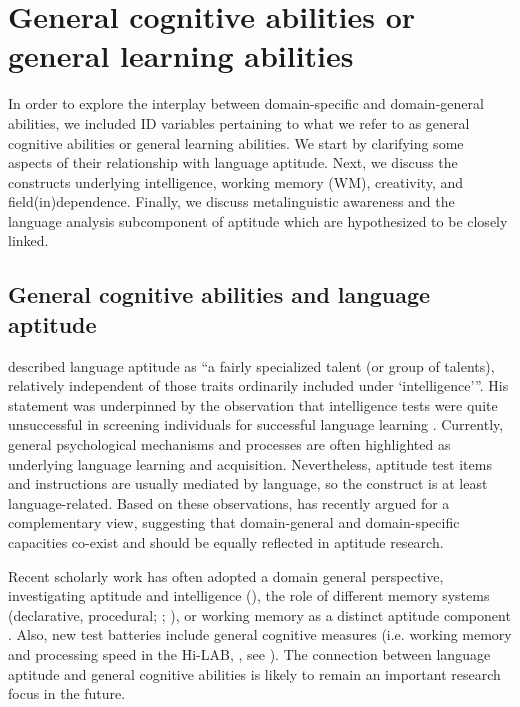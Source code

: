 \documentclass[output=paper]{langscibook}
\begin{document}
\section{General cognitive abilities or general learning abilities}

In order to explore the interplay between domain-specific and domain-general abilities, we included ID variables pertaining to what we refer to as general cognitive abilities or general learning abilities. We start by clarifying some aspects of their relationship with language aptitude. Next, we discuss the constructs underlying intelligence, working memory (WM), creativity, and field(in)dependence. Finally, we discuss metalinguistic awareness and the language analysis subcomponent of aptitude which are hypothesized to be closely linked.

\subsection{General cognitive abilities and language aptitude} %

\citet[89]{Carroll1964} described language aptitude as “a fairly specialized talent (or group of talents), relatively independent of those traits ordinarily included under ‘intelligence’”. His statement was underpinned by the observation that intelligence tests were quite unsuccessful in screening individuals for successful language learning \citep{Carroll1964}. Currently, general psychological mechanisms and processes are often highlighted as underlying language learning and acquisition. Nevertheless, aptitude test items and instructions are usually mediated by language, so the construct is at least language-related. Based on these observations, \citet{Skehan2019} has recently argued for a complementary view, suggesting that domain-general and domain-specific capacities co-exist and should be equally reflected in aptitude research. 

Recent scholarly work has often adopted a domain general perspective, investigating aptitude and intelligence (\citealt{Granena2012,Granena2013}), the role of different memory systems (declarative, procedural; \citealt{Carpenter2008}; \citealt{MorganShortEtAl2014}), or working memory as a distinct aptitude component \citep{Wen2019}. Also, new test batteries include general cognitive measures (i.e. working memory and processing speed in the Hi-LAB, \citealt{LinckEtAl2013}, see ). The connection between language aptitude and general cognitive abilities is likely to remain an important research focus in the future.
\end{document}
